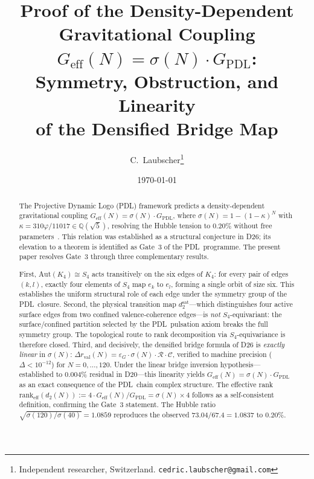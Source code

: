 \documentclass[11pt,a4paper]{article}
\theoremstyle{definition}
\newcommand{\PDL}{\textnormal{PDL}}
\newcommand{\epsg}{\varepsilon_G}
\newcommand{\Kfour}{K_4}
\newcommand{\vp}{\varphi}
\newcommand{\kap}{\kappa}
\newcommand{\calC}{\mathcal{C}}
\newcommand{\calR}{\mathcal{R}}
\newcommand{\GPDL}{G_{\mathrm{PDL}}}
\newcommand{\Geff}{G_{\mathrm{eff}}}
\newcommand{\sig}{\sigma}
\newcommand{\dmap}{d_2}
\newcommand{\drval}{\Delta r_{\mathrm{val}}}
\begin{document}
\title{Proof of the Density-Dependent Gravitational Coupling\\[4pt]
$\Geff(N) = \sig(N)\cdot\GPDL$:\\[4pt]
Symmetry, Obstruction, and Linearity\\[4pt]
of the Densified Bridge Map}
\author{C.~Laubscher\thanks{Independent researcher, Switzerland. \texttt{cedric.laubscher@gmail.com}}\\[4pt]}
\date{\small \today}
\maketitle

\begin{abstract}
The Projective Dynamic Logo (\PDL) framework predicts a density-dependent gravitational coupling $\Geff(N) = \sig(N)\cdot\GPDL$, where $\sig(N) = 1-(1-\kap)^N$ with $\kap = 310\vp/11017 \in \mathbb{Q}(\sqrt{5})$, resolving the Hubble tension to $0.20\%$ without free parameters~\cite{Hubble_PDL_2026,NCMB_PDL_2026}. This relation was established as a structural conjecture in D26; its elevation to a theorem is identified as Gate~3 of the \PDL\ programme. The present paper resolves Gate~3 through three complementary results.

First, $\mathrm{Aut}(\Kfour) \cong S_4$ acts transitively on the six edges of $\Kfour$: for every pair of edges $(k,l)$, exactly four elements of $S_4$ map $e_k$ to $e_l$, forming a single orbit of size six. This establishes the uniform structural role of each edge under the symmetry group of the \PDL\ closure. Second, the physical transition map $\dmap^{\mathrm{sat}}$---which distinguishes four active surface edges from two confined valence-coherence edges---is \emph{not} $S_4$-equivariant: the surface/confined partition selected by the \PDL\ pulsation axiom breaks the full symmetry group. The topological route to rank decomposition via $S_4$-equivariance is therefore closed. Third, and decisively, the densified bridge formula of D26 is \emph{exactly linear} in $\sig(N)$: $\drval(N) = \epsg\cdot\sig(N)\cdot\calR\cdot\calC$, verified to machine precision ($\Delta < 10^{-12}$) for $N = 0,\ldots,120$. Under the linear bridge inversion hypothesis---established to $0.004\%$ residual in D20---this linearity yields $\Geff(N) = \sig(N)\cdot\GPDL$ as an exact consequence of the \PDL\ chain complex structure. The effective rank $\mathrm{rank}_{\mathrm{eff}}(\dmap(N)) := 4\cdot\Geff(N)/\GPDL = \sig(N)\times 4$ follows as a self-consistent definition, confirming the Gate~3 statement. The Hubble ratio $\sqrt{\sig(120)/\sig(40)} = 1.0859$ reproduces the observed $73.04/67.4 = 1.0837$ to $0.20\%$.
\end{abstract}
\end{document}
